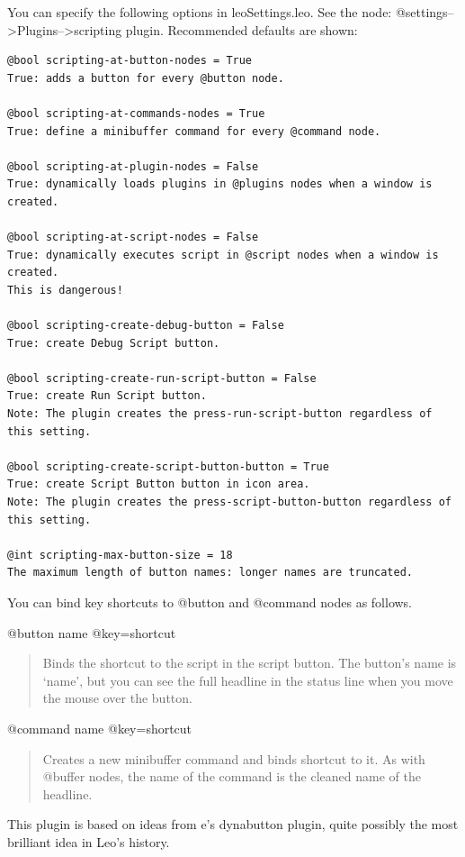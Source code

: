 \documentclass[a4paper,10pt,english]{sphinxmanual}
\begin{document}
You can specify the following options in leoSettings.leo.  See the node:
@settings--\textgreater{}Plugins--\textgreater{}scripting plugin.  Recommended defaults are shown:

\begin{Verbatim}[commandchars=\\\{\}]
@bool scripting-at-button-nodes = True
True: adds a button for every @button node.

@bool scripting-at-commands-nodes = True
True: define a minibuffer command for every @command node.

@bool scripting-at-plugin-nodes = False
True: dynamically loads plugins in @plugins nodes when a window is created.

@bool scripting-at-script-nodes = False
True: dynamically executes script in @script nodes when a window is created.
This is dangerous!

@bool scripting-create-debug-button = False
True: create Debug Script button.

@bool scripting-create-run-script-button = False
True: create Run Script button.
Note: The plugin creates the press-run-script-button regardless of this setting.

@bool scripting-create-script-button-button = True
True: create Script Button button in icon area.
Note: The plugin creates the press-script-button-button regardless of this setting.

@int scripting-max-button-size = 18
The maximum length of button names: longer names are truncated.
\end{Verbatim}

You can bind key shortcuts to @button and @command nodes as follows.

@button name @key=shortcut
\begin{quote}

Binds the shortcut to the script in the script button. The button's name is
`name', but you can see the full headline in the status line when you move the
mouse over the button.
\end{quote}

@command name @key=shortcut
\begin{quote}

Creates a new minibuffer command and binds shortcut to it. As with @buffer
nodes, the name of the command is the cleaned name of the headline.
\end{quote}

This plugin is based on ideas from e's dynabutton plugin, quite possibly the
most brilliant idea in Leo's history.
\end{document}
